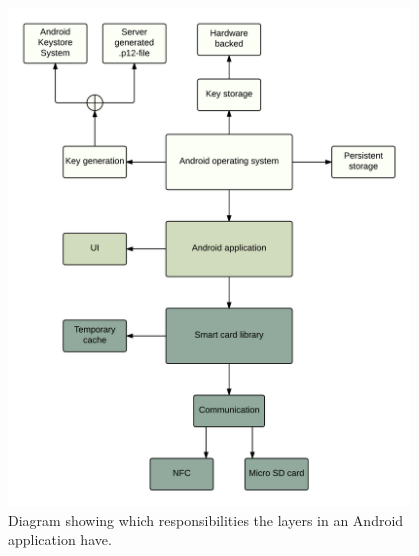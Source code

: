 \begin{figure}[h!]
  \caption{Diagram showing which responsibilities the layers in an Android application have.}
  \label{fig:responsibility}
  \centering
    \includegraphics[width=0.95\textwidth]{images/Component_diagram.png}
\end{figure}
